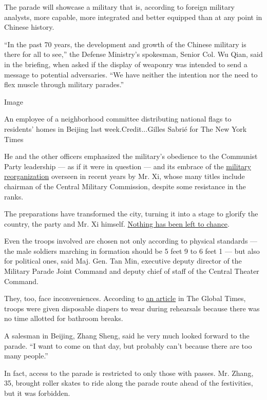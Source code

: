The parade will showcase a military that is, according to foreign
military analysts, more capable, more integrated and better equipped
than at any point in Chinese history.

``In the past 70 years, the development and growth of the Chinese
military is there for all to see,'' the Defense Ministry's spokesman,
Senior Col. Wu Qian, said in the briefing, when asked if the display of
weaponry was intended to send a message to potential adversaries. ``We
have neither the intention nor the need to flex muscle through military
parades.''

Image

An employee of a neighborhood committee distributing national flags to
residents' homes in Beijing last week.Credit...Gilles Sabrié for The New
York Times

He and the other officers emphasized the military's obedience to the
Communist Party leadership --- as if it were in question --- and its
embrace of the
\href{https://www.nytimes3xbfgragh.onion/2017/10/11/world/asia/xi-jinping-military-china-purge.html}{military
reorganization} overseen in recent years by Mr. Xi, whose many titles
include chairman of the Central Military Commission, despite some
resistance in the ranks.

The preparations have transformed the city, turning it into a stage to
glorify the country, the party and Mr. Xi himself.
\href{https://www.nytimes3xbfgragh.onion/2019/09/23/world/asia/china-xi-jinping-communist-party-70th-anniversary.html}{Nothing
has been left to chance}.

Even the troops involved are chosen not only according to physical
standards --- the male soldiers marching in formation should be 5 feet 9
to 6 feet 1 --- but also for political ones, said Maj. Gen. Tan Min,
executive deputy director of the Military Parade Joint Command and
deputy chief of staff of the Central Theater Command.

They, too, face inconveniences. According to
\href{http://www.globaltimes.cn/content/1163738.shtml}{an article} in
The Global Times, troops were given disposable diapers to wear during
rehearsals because there was no time allotted for bathroom breaks.

A salesman in Beijing, Zhang Sheng, said he very much looked forward to
the parade. ``I want to come on that day, but probably can't because
there are too many people.''

In fact, access to the parade is restricted to only those with passes.
Mr. Zhang, 35, brought roller skates to ride along the parade route
ahead of the festivities, but it was forbidden.

